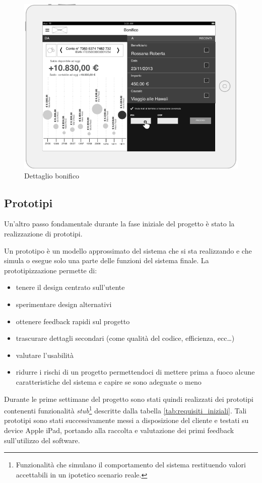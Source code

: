 \begin{figure}[!htbp]
\centering
\includegraphics[scale=0.85]{primo_wireframe/bonifico2.png}
\caption{Dettaglio bonifico}
\end{figure}

\newpage
\subsection{Prototipi}
Un'altro passo fondamentale durante la fase iniziale del progetto è stato la realizzazione di prototipi.

Un prototipo è un modello approssimato del sistema che si sta realizzando e che simula o esegue solo una parte delle funzioni del sistema finale.
La prototipizzazione permette di:

\begin{itemize}
  \item tenere il design centrato sull’utente 
  \item sperimentare design alternativi
  \item ottenere feedback rapidi sul progetto
  \item trascurare dettagli secondari (come qualità del codice, efficienza, ecc\dots) 
  \item valutare l'usabilità
  \item ridurre i rischi di un progetto permettendoci di mettere prima a fuoco alcune caratteristiche del sistema e capire se sono adeguate o meno
\end{itemize}

Durante le prime settimane del progetto sono stati quindi realizzati dei prototipi contenenti funzionalità \emph{stub}\footnote{Funzionalità che simulano il comportamento  del sistema restituendo valori accettabili in un ipotetico scenario reale.} descritte dalla tabella \ref{tab:requisiti_iniziali}. Tali prototipi sono stati successivamente messi a disposizione del cliente e testati su device Apple iPad, portando alla raccolta e valutazione dei primi feedback sull'utilizzo del software.

